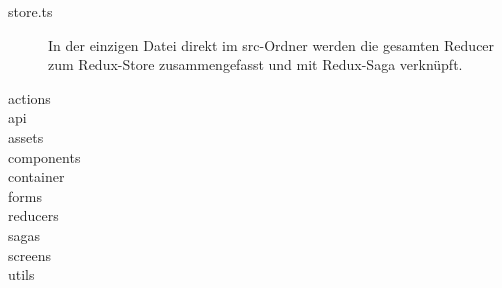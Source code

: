 \begin{description}
    \item[store.ts]
    In der einzigen Datei direkt im src-Ordner werden die gesamten Reducer zum Redux-Store zusammengefasst und mit
    Redux-Saga verknüpft.
    \item[actions]

    \item[api]
    \item[assets]
    \item[components]
    \item[container]
    \item[forms]
    \item[reducers]
    \item[sagas]
    \item[screens]
    \item[utils]
\end{description}


